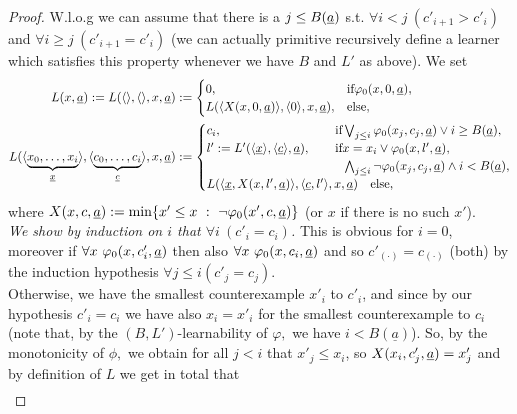 \begin{proof}
W.l.o.g we can assume that there is a $j\leq B(\underline a)$ s.t. $\forall i<j\ (c'_{i+1}>c'_i)$ and $\forall i\geq j\ (c'_{i+1}=c'_i)$ (we can actually primitive recursively define a learner which satisfies this property whenever we have $B$ and $L'$ as above). We set
\begin{align*}
L(x, \tup a):=L(\langle\rangle,\langle\rangle,x, \tup a)&:=\begin{cases}
0,&\Tif \phi_0(x,0,\tup a),\\
L( \langle X(x,0,\tup a)\rangle,\langle0\rangle,x,\tup a),&\Telse,\end{cases}\\ L(\langle \underbrace{x_0,\ldots,x_i}_{\tup x}\rangle, \langle \underbrace{c_0,\ldots,c_i}_{\tup c}\rangle,x,\tup a)&:=\begin{cases}
c_i,& \hspace*{-10mm}\Tif \bigvee_{j\leq i}\phi_0(x_j,c_j,\tup a)\vee i\ge B(\underline{a}),\\
l':=L'(\langle {\tup x}\rangle, \langle {\tup c}\rangle,\tup a),&
\hspace*{-10mm}\Tif x=x_i\vee \phi_0(x,l',\tup a),\\
&\hspace*{-10mm}\phantom{\Tif} \bigwedge_{j\leq i}\neg\phi_0(x_j,c_j,\tup a)\wedge i<B(\underline{a}),\\
L( \langle {\tup x},X(x,l',\tup a)\rangle,
\langle \tup c,l'\rangle,x,\tup a) &\Telse,
\end{cases}\\
\end{align*}
where $X(x,c,\underline a):=\min\{x'\leq x\ :\ \neg \varphi_0(x',c,\underline a)\}$ (or $x$ if there is no such $x'$).\\
{\em We show by induction on $i$ that $\forall i\ (c'_i = c_i)$.} This is obvious for $i=0$, moreover 
if $\forall x\ \varphi_0(x,c'_{i},\underline a)$ then also $\forall x\ \phi_0(x,c_{i},\tup a)$ and so $c'_{(\cdot)}=c_{(\cdot)}$ (both) by the induction hypothesis 
$\forall j\le i (c'_j=c_j).$\\ Otherwise, we have the smallest counterexample $x'_i$ to $c'_i$, and since by our hypothesis $c'_i=c_i$ we have also $x_i=x'_i$ for the smallest counterexample to $c_i$ (note that, by the 
$(B,L')$-learnability of $\varphi,$ we have $i<B(\underline{a})$). 
So, by the monotonicity of $\phi,$ we obtain for all $j<i$ that $x'_j\leq x_i$, so $X(x_i,c'_j,\underline a)=x'_j$ and by definition of $L$ we get in total that 
\begin{align*}

\end{align*}
\end{proof}
